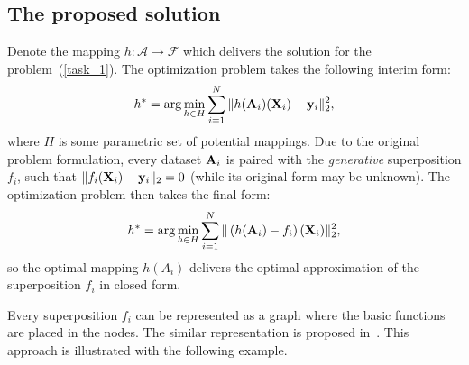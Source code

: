 \documentclass[11pt, tightenlines, twoside, onecolumn, nofloats, nobibnotes, nofootinbib, superscriptaddress, noshowpacks, centertags]{revtex4}
\begin{document}
\subsection{The proposed solution}

Denote the mapping $h:\mathcal{A}\to\mathcal{F}$ which delivers the solution for the problem~(\ref{task_1}). The optimization problem takes the following interim form:
\begin{align*}
h^{\ast}=\arg\min\limits_{h\in H}\sum_{i=1}^{N}\| h(\bold A_i)(\bold X_i)-\bold y_i\|_2^2,
\end{align*}
where $H$ is some parametric set of potential mappings. Due to the original problem formulation, every dataset $\bold A_i$ is paired with the \emph{generative} superposition $f_i$, such that $\| f_i(\bold X_i)-\bold y_i\|_2=0$ (while its original form may be unknown). The optimization problem then takes the final form:
\begin{align}
h^{\ast}=\arg\min\limits_{h\in H}\sum_{i=1}^{N}\|\left( h(\bold A_i)-f_i\right)(\bold X_i)\|_2^2,
\label{task_2}
\end{align}
so the optimal mapping $h(A_i)$ delivers the optimal approximation of the superposition $f_i$ in closed form.


Every superposition $f_i$ can be represented as a graph where the basic functions are placed in the nodes. The similar representation is proposed in~\cite{Bochkarev2017}. This approach is illustrated with the following example.
\end{document}

